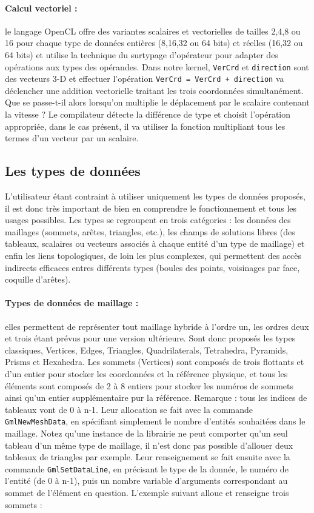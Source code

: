 \documentclass[a4paper,12pt]{article}
\begin{document}
\paragraph{Calcul vectoriel : } le langage OpenCL offre des variantes scalaires et vectorielles de tailles 2,4,8 ou 16 pour chaque type de données entières (8,16,32 ou 64 bits) et réelles (16,32 ou 64 bits) et utilise la technique du surtypage d'opérateur pour adapter des opérations aux types des opérandes. Dans notre kernel, {\tt VerCrd} et {\tt direction} sont des vecteurs 3-D et effectuer l'opération {\tt VerCrd = VerCrd + direction} va déclencher une addition vectorielle traitant les trois coordonnées simultanément.
Que se passe-t-il alors lorsqu'on multiplie le déplacement par le scalaire contenant la vitesse ?
Le compilateur détecte la différence de type et choisit l'opération appropriée, dans le cas présent, il va utiliser la fonction multipliant tous les termes d'un vecteur par un scalaire.


\subsection{Les types de données}

L'utilisateur étant contraint à utiliser uniquement les types de données proposés, il est donc très important de bien en comprendre le fonctionnement et tous les usages possibles.
Les types se regroupent en trois catégories : les données des maillages (sommets, arêtes, triangles, etc.), les champs de solutions libres (des tableaux, scalaires ou vecteurs associés à chaque entité d'un type de maillage) et enfin les liens topologiques, de loin les plus complexes, qui permettent des accès indirects efficaces entres différents types (boules des points, voisinages par face, coquille d'arêtes).

\paragraph{Types de données de maillage :} elles permettent de représenter tout maillage hybride à l'ordre un, les ordres deux et trois étant prévus pour une version ultérieure. Sont donc proposés les types classiques, Vertices, Edges, Triangles, Quadrilaterals, Tetrahedra, Pyramids, Prisms et Hexahedra. Les sommets (Vertices) sont composés de trois flottants et d'un entier pour stocker les coordonnées et la référence physique, et tous les éléments sont composés de 2 à 8 entiers pour stocker les numéros de sommets ainsi qu'un entier supplémentaire pur la référence.
Remarque : tous les indices de tableaux vont de 0 à n-1.
Leur allocation se fait avec la commande {\tt GmlNewMeshData}, en spécifiant simplement le nombre d'entités souhaitées dans le maillage. Notez qu'une instance de la librairie ne peut comporter qu'un seul tableau d'un même type de maillage, il n'est donc pas possible d'allouer deux tableaux de triangles par exemple.
Leur renseignement se fait ensuite avec la commande {\tt GmlSetDataLine}, en précisant le type de la donnée, le numéro de l'entité (de 0 à n-1), puis un nombre variable d'arguments correspondant au sommet de l'élément en question.
L'exemple suivant alloue et renseigne trois sommets :
\end{document}
